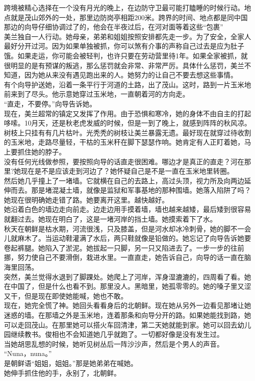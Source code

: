 跨境被精心选择在一个没有月光的晚上，在边防守卫最可能打瞌睡的时候行动。地点就是茂山郊外的一处，那里边防岗亭相距200米。跨界的时间、地点都是同中国那边的向导仔细协调过了的，他会在半夜过后，在河对面等着这些“包裹”\\

美兰独自一人行动。她母亲，弟弟和姐姐按照安排都先走一步。为了安全，全家人最好分开过河。因为如果单独被抓，你可以煞有介事的声称自己过去是应为肚子饿。如果走运，你可能会被轻判，也许只要在劳动营里待1年。如果全家被抓，就很明显的是有预谋的叛逃，那么惩罚就会非常、非常严厉。具体什么惩罚，美兰不知道，因为她从来没有遇见跑出来的人。她努力的让自己不要去想这些事情。\\

有个向导护送她，沿着一条平行于河道的土路，出了茂山。这时，路到一片玉米地前来到了尽头。他示意她穿过玉米地，一直朝着河的方向走。\\

“直走，不要停。”向导告诉她。\\

现在，美兰超常的镇定又发挥了作用。由于恐惧和寒冷，她的身体不由自主的打起哆嗦。10月天，还是秋老虎发威的时候，但是一到了晚上，就感到阵阵的秋风凉。树枝上只挂有有几片枯叶。光秃秃的树枝让美兰暴露无遗。最好现在就穿过待收割的玉米地，走路尽量轻，干枯的玉米秆在脚下瑟瑟作响。她肯定有人正盯着她，马上要抓住她的脖子。\\

没有任何光线做参照，要按照向导的话直走很困难。哪边才是真正的直走？河在那里?她现在是不是应该走到河边了？她怀疑自己是不是一直在玉米地里转圈。\\

然后她几乎撞上了一堵墙。它就横在自己的去路上，高过头顶，视力所及向两边延伸而去。那是堵混凝土墙，就像是监狱和军事基地的那种围墙。她落入陷阱了吗？她现在很明确她走错了路。她要离开这里。越快越好。\\

她沿着白色的墙边走向前走。边走边用手摸着墙，墙也越来越矮，最后矮到很容易就翻过去。她现在明白了，这是一堵河岸的挡土墙。她摸索着下了水。\\

秋天在朝鲜是枯水期，河流很浅，只及膝盖，但是河水却冰冷刺骨，她的脚不一会儿就麻木了。当运动鞋灌满了水后，两只鞋就像是铅做的。她忘记了向导告诉她要卷起裤腿。她陷入了淤泥。她拔起一只脚，另一只又陷进去了。一步一步的往前挪，努力使自己不要滑倒，栽进水里。一直直走，她告诉自己，向导的话一直在脑海里回荡。\\

突然，美兰觉得水退到了脚踝处。她爬上了河岸，浑身湿漉漉的，四周看了看。她在中国了，但是什么也看不到。那里没人。黑暗里，她孤零零的。她的嗓子里又涩又干，但是现在即使她能喊，她也不敢。\\

现在，她完全慌了神。她回头看看身后的北朝鲜。现在她从另外一边看见那堵让她迷惑的墙。在那墙之外是玉米地，连着那条和向导分开的路。如果她能找到路，她可以走回茂山。在那里她可以搭火车回清津，第二天她就能到家。她可以回去幼儿园继续教书。俊相也不会知道她几乎就跑了。一切都好像是没有发生过。\\

当她胡思乱想的时候，她听见树丛后一阵沙沙声，然后是个男人的声音。\\

“Nuna，nuna。”\\

是朝鲜语“姐姐，姐姐。”那是她弟弟在喊她。\\

她伸手抓住他的手，永别了，北朝鲜。\\